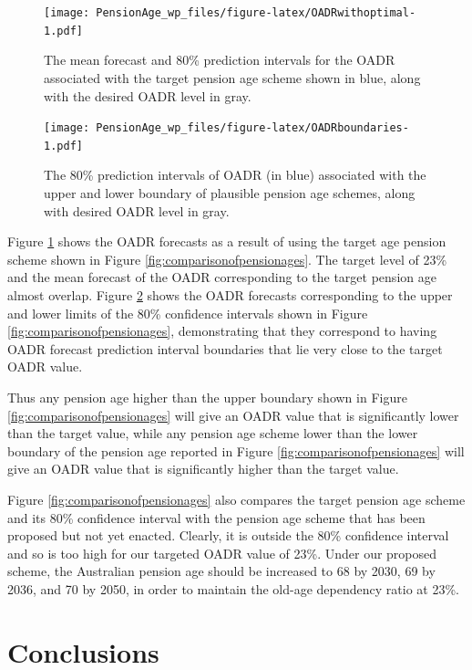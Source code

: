 \documentclass[11pt,a4paper,]{article}
\begin{document}
\begin{figure}
\centering
\texttt{[image: PensionAge\_wp\_files/figure-latex/OADRwithoptimal-1.pdf]}
\caption{\label{fig:OADRwithoptimal}The mean forecast and 80\% prediction intervals for the OADR associated with the target pension age scheme shown in blue, along with the desired OADR level in gray.}
\end{figure}

\begin{figure}
\centering
\texttt{[image: PensionAge\_wp\_files/figure-latex/OADRboundaries-1.pdf]}
\caption{\label{fig:OADRboundaries}The 80\% prediction intervals of OADR (in blue) associated with the upper and lower boundary of plausible pension age schemes, along with desired OADR level in gray.}
\end{figure}

Figure \ref{fig:OADRwithoptimal} shows the OADR forecasts as a result of using the target age pension scheme shown in Figure \ref{fig:comparisonofpensionages}. The target level of 23\% and the mean forecast of the OADR corresponding to the target pension age almost overlap. Figure \ref{fig:OADRboundaries} shows the OADR forecasts corresponding to the upper and lower limits of the 80\% confidence intervals shown in Figure \ref{fig:comparisonofpensionages}, demonstrating that they correspond to having OADR forecast prediction interval boundaries that lie very close to the target OADR value.

Thus any pension age higher than the upper boundary shown in Figure \ref{fig:comparisonofpensionages} will give an OADR value that is significantly lower than the target value, while any pension age scheme lower than the lower boundary of the pension age reported in Figure \ref{fig:comparisonofpensionages} will give an OADR value that is significantly higher than the target value.

Figure \ref{fig:comparisonofpensionages} also compares the target pension age scheme and its 80\% confidence interval with the pension age scheme that has been proposed but not yet enacted. Clearly, it is outside the 80\% confidence interval and so is too high for our targeted OADR value of 23\%. Under our proposed scheme, the Australian pension age should be increased to 68 by 2030, 69 by 2036, and 70 by 2050, in order to maintain the old-age dependency ratio at 23\%.

\hypertarget{sec:conclusions}{%
\section{Conclusions}\label{sec:conclusions}}
\end{document}
